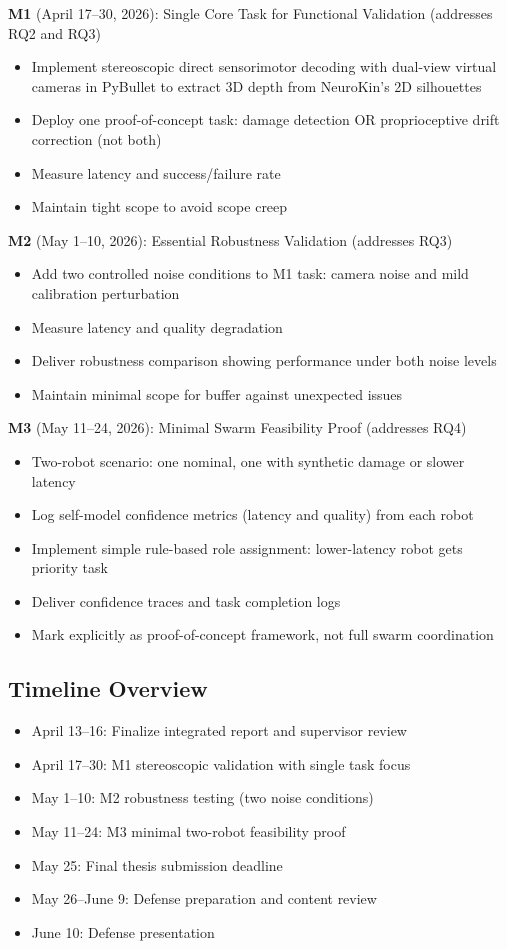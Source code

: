 ﻿\documentclass[11pt,a4paper]{article}
\begin{document}
\textbf{M1} (April 17–30, 2026): Single Core Task for Functional Validation (addresses RQ2 and RQ3)
\begin{itemize}
  \item Implement stereoscopic direct sensorimotor decoding with dual-view virtual cameras in PyBullet to extract 3D depth from NeuroKin's 2D silhouettes
  \item Deploy one proof-of-concept task: damage detection OR proprioceptive drift correction (not both)
  \item Measure latency and success/failure rate
  \item Maintain tight scope to avoid scope creep
\end{itemize}

\textbf{M2} (May 1–10, 2026): Essential Robustness Validation (addresses RQ3)
\begin{itemize}
  \item Add two controlled noise conditions to M1 task: camera noise and mild calibration perturbation
  \item Measure latency and quality degradation
  \item Deliver robustness comparison showing performance under both noise levels
  \item Maintain minimal scope for buffer against unexpected issues
\end{itemize}

\textbf{M3} (May 11–24, 2026): Minimal Swarm Feasibility Proof (addresses RQ4)
\begin{itemize}
  \item Two-robot scenario: one nominal, one with synthetic damage or slower latency
  \item Log self-model confidence metrics (latency and quality) from each robot
  \item Implement simple rule-based role assignment: lower-latency robot gets priority task
  \item Deliver confidence traces and task completion logs
  \item Mark explicitly as proof-of-concept framework, not full swarm coordination
\end{itemize}

\subsection{Timeline Overview}

\begin{itemize}
  \item April 13–16: Finalize integrated report and supervisor review
  \item April 17–30: M1 stereoscopic validation with single task focus
  \item May 1–10: M2 robustness testing (two noise conditions)
  \item May 11–24: M3 minimal two-robot feasibility proof
  \item May 25: Final thesis submission deadline
  \item May 26–June 9: Defense preparation and content review
  \item June 10: Defense presentation
\end{itemize}
\end{document}
